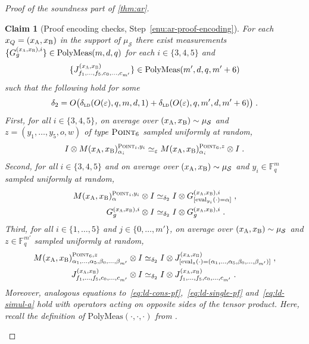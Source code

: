 \documentclass[11pt]{article}
\newtheorem{claim}[theorem]{Claim}
\theoremstyle{definition}
\newcommand{\F}{\ensuremath{\mathbb{F}}}
\newcommand{\ot}{\otimes}
\newcommand{\ld}{\textsc{ld}}
\newcommand{\eps}{\varepsilon}
\newcommand{\sampler}{\mathcal{S}}
\newcommand{\labelstyle}[1]{\ensuremath{\textsc{#1}}\xspace}
\newcommand{\alice}{\labelstyle{A}}
\newcommand{\bob}{\labelstyle{B}}
\newcommand{\typestyle}[1]{\ensuremath{\textsc{#1}}\xspace}
\newcommand{\Point}{\typestyle{Point}}
\newcommand{\polymeas}[3]{\mathrm{PolyMeas}(#1,#2,#3)}
\newcommand{\simulpolymeas}[4]{\mathrm{PolyMeas}(#1,#2,#3, #4)}
\newcommand{\eval}{\mathrm{eval}}
\begin{document}
\begin{proof}[Proof of the soundness part of \cref{thm:ar}]
  \begin{claim}[Proof encoding checks, Step~\ref{enu:ar-proof-encoding}]
    \label{claim:ar-4}
    For each $x_Q=(x_\alice,x_\bob)$ in the support of $\mu_\sampler$ there
    exist measurements $\{G^{(x_\alice,x_\bob),i}_{g}\} \in \polymeas{m}{d}{q}$
    for each $i\in\{3,4,5\}$ and
    \begin{equation*}\{J^{({x}_\alice, {x}_\bob)}_{f_1, \dots, f_5, c_0,
      \dots, c_{m'}}\} \in \simulpolymeas{m'}{d}{q}{m'+6}
      \end{equation*}
      such that
    the following hold for some
    \begin{equation*}
      \delta_2 = O\big(\delta_{\ld}(O({\eps}), q, m, d, 1)+
      \delta_{\ld}(O({\eps}), q, m', d, m'+6)\big)\;.
    \end{equation*}
    First, for all $i\in \{3,4,5\}$, on average over $({x}_\alice, {x}_\bob)
    \sim \mu_{\sampler}$ and $z=(y_1,\ldots,y_5,o,w)$ of type $\Point_6$ sampled
    uniformly at random,
    \begin{equation}
      I \ot M({x}_\alice, {x}_\bob)^{ \Point_i, y_i}_{\alpha_i} \simeq_{\eps}
      M({x}_\alice, {x}_\bob)^{\Point_6, z}_{\alpha_i} \ot I\;.
      \label{eq:ld-cons-pf}
    \end{equation}
    Second, for all $i\in \{3,4,5\}$ and on average over $({x}_\alice, {x}_\bob)
    \sim \mu_{\sampler}$ and $y_i\in\F_q^m$ sampled uniformly at random,
    \begin{align}
      M({x}_\alice, {x}_\bob)^{\Point_i,  y_i}_{\alpha}\ot I
      &\simeq_{\delta_2} I \ot G^{({x}_\alice, {x}_\bob), i}_{[\eval_{y_i}(\cdot) =
        \alpha]}\;, \label{eq:ld-single-pf} \\
      G^{({x}_\alice, {x}_\bob), i}_{g} \ot I
      &\simeq_{\delta_2} I \ot G^{({x}_\alice, {x}_\bob),
        i}_{g}\;. \label{eq:ld-self-pf}
    \end{align}
    Third, for all $i\in\{1,\ldots,5\}$ and $j\in\{0,\ldots,m'\}$, on average
    over $({x}_\alice, {x}_\bob) \sim \mu_{\sampler}$ and $z\in\F_q^{m'}$
    sampled uniformly at random,
    \begin{align}
      M({x}_\alice, {x}_\bob)^{\Point_6,  z}_{\alpha_1, \ldots, \alpha_5,
      \beta_0, \ldots, \beta_{m'}} \ot I
      & \simeq_{\delta_2} I \ot J^{({x}_\alice, {x}_\bob) }_{[\eval_{z}(\cdot) =
        (\alpha_1,\ldots,\alpha_5,\beta_0,\ldots,\beta_{m'})]}\;,
        \label{eq:ld-simul-a}\\
      J^{({x}_\alice,{x}_\bob)}_{f_1, \dots, f_5, c_0, \dots, c_{m'}} \ot I
      &\simeq_{\delta_2} I \ot J^{({x}_\alice, {x}_\bob)}_{f_1, \dots, f_5,
        c_0, \dots, c_{m'}}\;.\label{eq:ld-self-simul}
    \end{align}
    Moreover, analogous equations
    to~\eqref{eq:ld-cons-pf},~\eqref{eq:ld-single-pf} and~\eqref{eq:ld-simul-a}
    hold with operators acting on opposite sides of the tensor product.
    Here, recall the definition of $\polymeas{\cdot}{\cdot}{\cdot}$ from
    .


\end{claim}
\end{proof}
\end{document}
